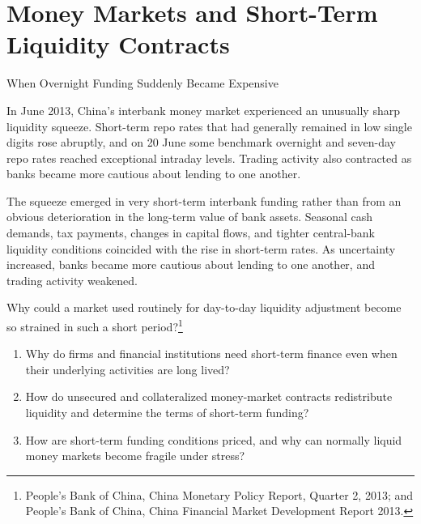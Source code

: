 \chapter{Money Markets and Short-Term Liquidity Contracts}
\label{chap:Money_Markets_and_Short_Term_Liquidity_Contracts}

\begin{openingcase}{When Overnight Funding Suddenly Became Expensive}

In June 2013, China's interbank money market experienced an unusually sharp liquidity squeeze. Short-term repo rates that had generally remained in low single digits rose abruptly, and on 20 June some benchmark overnight and seven-day repo rates reached exceptional intraday levels. Trading activity also contracted as banks became more cautious about lending to one another.

The squeeze emerged in very short-term interbank funding rather than from an obvious deterioration in the long-term value of bank assets. Seasonal cash demands, tax payments, changes in capital flows, and tighter central-bank liquidity conditions coincided with the rise in short-term rates. As uncertainty increased, banks became more cautious about lending to one another, and trading activity weakened.

Why could a market used routinely for day-to-day liquidity adjustment become so strained in such a short period?\footnote{People's Bank of China, China Monetary Policy Report, Quarter 2, 2013; and People's Bank of China, China Financial Market Development Report 2013.}

\end{openingcase}

\begin{tcolorbox}[
  enhanced,
  colback=FinanceBlue!6,
  colframe=FinanceBlue,
  boxrule=0.6pt,
  sharp corners,
  left=8pt,
  right=8pt,
  top=7pt,
  bottom=7pt,
  before skip=1em,
  after skip=1.6em,
  title=\textbf{Core Questions},
  coltitle=white,
  colbacktitle=FinanceBlue,
  fonttitle=\bfseries,
  attach boxed title to top left={xshift=6pt,yshift=-2mm},
  boxed title style={
    boxrule=0pt,
    sharp corners,
    left=5pt,
    right=5pt,
    top=2pt,
    bottom=2pt
  }
]
\begin{enumerate}[
  leftmargin=*,
  label=\textcolor{FinanceBlue}{\textbf{\arabic*.}},
  itemsep=0.55em,
  topsep=0.2em
]

\item Why do firms and financial institutions need short-term finance even when their underlying activities are long lived?

\item How do unsecured and collateralized money-market contracts redistribute liquidity and determine the terms of short-term funding?

\item How are short-term funding conditions priced, and why can normally liquid money markets become fragile under stress?

\end{enumerate}
\end{tcolorbox}

